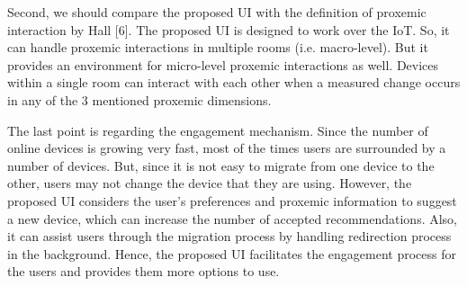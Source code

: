 \documentclass[runningheads,a4paper]{llncs}
\begin{document}
Second, we should compare the proposed UI with the definition of proxemic
interaction by Hall [6]. The proposed UI is designed to work over the IoT. So,
it can handle proxemic interactions in multiple rooms (i.e. macro-level). But it
provides an environment for micro-level proxemic interactions as well. Devices
within a single room can interact with each other when a measured change occurs
in any of the 3 mentioned proxemic dimensions.


The last point is regarding the engagement mechanism. Since the number
of online devices is growing very fast, most of the times users are surrounded
by a number of devices. But, since it is not easy to migrate from one device to
the other, users may not change the device that they are using. However, the
proposed UI considers the user’s preferences and proxemic information to suggest
a new device, which can increase the number of accepted recommendations. Also,
it can assist users through the migration process by handling redirection process
in the background. Hence, the proposed UI facilitates the engagement process
for the users and provides them more options to use.
\end{document}
